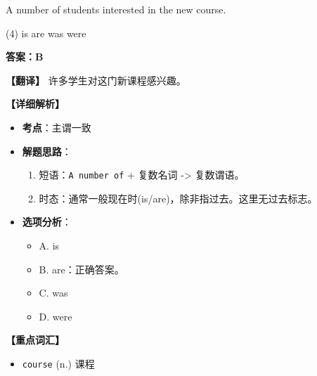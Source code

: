 \documentclass[11pt, a4paper]{article}
\newcommand{\analysis}[4]{
    \begin{solutionbox}
        \textbf{答案：#1}
        
        \textbf{【翻译】} #2
        
        \textbf{【详细解析】}
        #3
        
        \textbf{【重点词汇】}
        #4
    \end{solutionbox}
}
\newcommand{\blank}{\underline{\hspace{1.5cm}}}
\begin{document}
\begin{questions}
    \item A number of students \blank interested in the new course.
    \begin{tasks}(4)
        \task is \task are \task was \task were
    \end{tasks}
    \analysis{B}{许多学生对这门新课程感兴趣。}{
        \begin{itemize}
            \item \textbf{考点}：主谓一致
            \item \textbf{解题思路}：
                \begin{enumerate}
                    \item 短语：\texttt{A number of} + 复数名词 -> 复数谓语。
                    \item 时态：通常一般现在时(is/are)，除非指过去。这里无过去标志。
                \end{enumerate}
            \item \textbf{选项分析}：
                \begin{itemize}
                    \item A. is
                    \item B. are：正确答案。
                    \item C. was
                    \item D. were
                \end{itemize}
        \end{itemize}
    }{
        \begin{itemize}
            \item \texttt{course} (n.) 课程
        \end{itemize}
    }


\end{questions}
\end{document}
